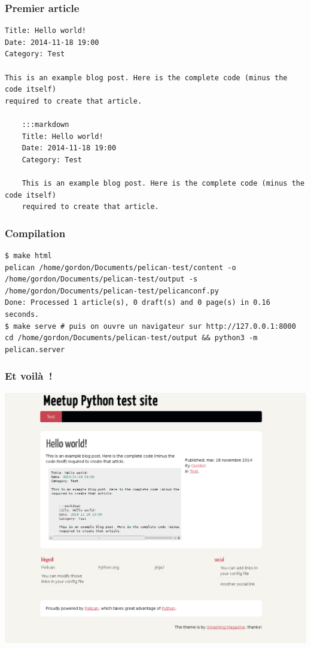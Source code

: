 \documentclass[frenchb,francais]{beamer}
\begin{document}
\begin{frame}[containsverbatim]
    \frametitle{Premier article}
    \begin{lstlisting}
Title: Hello world!
Date: 2014-11-18 19:00
Category: Test

This is an example blog post. Here is the complete code (minus the code itself)
required to create that article.

    :::markdown
    Title: Hello world!
    Date: 2014-11-18 19:00
    Category: Test

    This is an example blog post. Here is the complete code (minus the code itself)
    required to create that article.
    \end{lstlisting}
\end{frame}

\begin{frame}[containsverbatim]
    \frametitle{Compilation}
    \lstset{language=bash}
    \begin{lstlisting}
$ make html
pelican /home/gordon/Documents/pelican-test/content -o /home/gordon/Documents/pelican-test/output -s /home/gordon/Documents/pelican-test/pelicanconf.py 
Done: Processed 1 article(s), 0 draft(s) and 0 page(s) in 0.16 seconds.
$ make serve # puis on ouvre un navigateur sur http://127.0.0.1:8000
cd /home/gordon/Documents/pelican-test/output && python3 -m pelican.server
    \end{lstlisting}
\end{frame}

\begin{frame}
    \frametitle{Et voilà !}
    \begin{center}\includegraphics[scale=.20]{img/comments.png}\end{center}
\end{frame}
\end{document}
